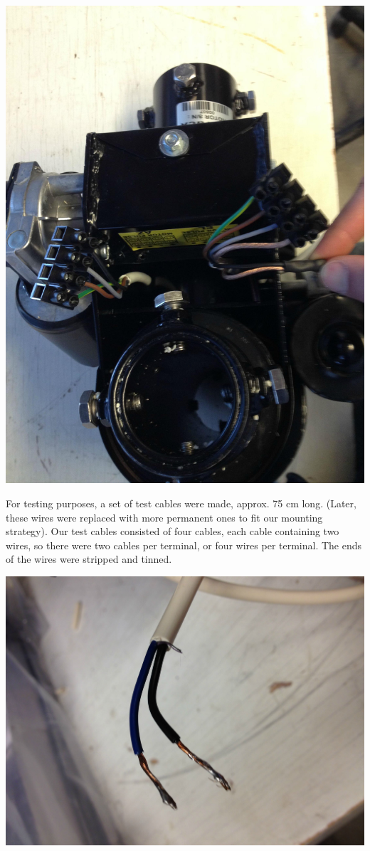 \documentclass[11pt]{article} %
\begin{document}
\begin{center}
\includegraphics[scale=0.10]{wiring/05.jpeg}
\end{center}


For testing purposes, a set of test cables were made, approx. 75 cm long. (Later, these wires were replaced with more permanent ones to fit our mounting strategy). Our test cables consisted of four cables, each cable containing two wires, so there were two cables per terminal, or four wires per terminal. The ends of the wires were stripped and tinned.

\begin{center}
\includegraphics[scale=0.10]{wiring/06.jpeg}
\end{center}
\end{document}
